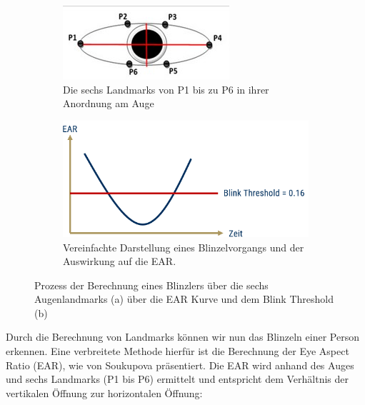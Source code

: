\begin{figure}
    \centering
    \begin{subfigure}{0.45\textwidth}
        \includegraphics[width=\linewidth]{images/EyeLandmarks.jpg}
        \caption{Die sechs Landmarks von P1 bis zu P6 in ihrer Anordnung am Auge \cite{DE22}}
        \label{fig:eyelandmarks}
    \end{subfigure}
    \hfill
    \begin{subfigure}{0.45\textwidth}
        \includegraphics[width=\linewidth]{images/EARCurve.png}
        \caption{Vereinfachte Darstellung eines Blinzelvorgangs und der Auswirkung auf die EAR.}
        \label{fig:earcurve}
    \end{subfigure}
    \caption{Prozess der Berechnung eines Blinzlers über die sechs Augenlandmarks (a) über die EAR Kurve und dem Blink Threshold (b)}
    \label{fig:eyeaspectratio}
\end{figure}

Durch die Berechnung von Landmarks können wir nun das Blinzeln einer Person erkennen. Eine verbreitete Methode hierfür ist die Berechnung der 	\glqq Eye Aspect Ratio\grqq{} (EAR), wie von Soukupova \cite{SO16} präsentiert. Die EAR wird anhand des Auges und sechs Landmarks (P1 bis P6) ermittelt und entspricht dem Verhältnis der vertikalen Öffnung zur horizontalen Öffnung:

